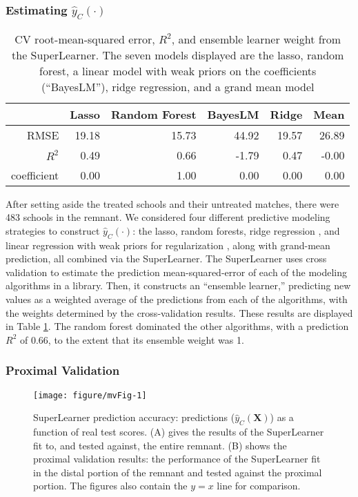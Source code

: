 \documentclass[12pt]{article}\usepackage[]{graphicx}\usepackage[]{color}
\makeatletter
\def\maxwidth{ %
  \ifdim\Gin@nat@width>\linewidth
    \linewidth
  \else
    \Gin@nat@width
  \fi
}
\newenvironment{knitrout}{}{} %
\newcommand{\algorithm}{\hat{y}_C(\cdot)}
\newcommand{\covMat}{\bm{X}}
\makeatother
\begin{document}
\subsubsection{Estimating  $\algorithm$}
\begin{table}[ht]
\centering
\begin{tabular}{rrrrrr}
  \hline
 & Lasso & Random Forest & BayesLM & Ridge & Mean \\ 
  \hline
RMSE & 19.18 & 15.73 & 44.92 & 19.57 & 26.89 \\ 
  $R^2$ & 0.49 & 0.66 & -1.79 & 0.47 & -0.00 \\ 
  coefficient & 0.00 & 1.00 & 0.00 & 0.00 & 0.00 \\ 
   \hline
\end{tabular}
\caption{CV root-mean-squared error,  $R^2$, and ensemble learner weight from the SuperLearner. The seven models displayed are the lasso, random forest, a linear model with weak priors on the coefficients (``BayesLM''), ridge regression, and a grand mean model} 
\label{cvTab}
\end{table}



After setting aside the treated schools and their untreated matches, there were 483 schools in the remnant.
We considered four different predictive modeling strategies to
construct $\algorithm$: the lasso, random forests, ridge regression
\citep{hoerl1970ridge,MASS}, and linear regression with weak priors for
regularization \citep{arm},
 along with
grand-mean prediction, all combined via the
SuperLearner.
The SuperLearner uses cross validation to estimate the prediction mean-squared-error of each of the
modeling algorithms in a library.
Then, it constructs an ``ensemble learner,'' predicting new values as
a weighted average of the predictions from each of the algorithms,
with the weights determined by the cross-validation results.
These results are displayed in Table \ref{cvTab}.
The random forest dominated the other algorithms, with a
prediction $R^2$ of 0.66, to the
extent that its ensemble weight was
1.



\subsubsection{Proximal Validation}


\begin{figure}
\begin{knitrout}
\color{fgcolor}
\texttt{[image: figure/mvFig-1]} 

\end{knitrout}
\caption{SuperLearner prediction accuracy:
predictions ($\hat{y}_C(\covMat)$) as a function of real test scores. (A) gives
the results of the SuperLearner fit to, and tested against, the entire remnant. (B) shows
the proximal validation results: the performance of the SuperLearner fit in the distal portion of the remnant and tested against the proximal portion. The figures also contain the $y=x$
line for comparison.}
\label{fig:cv}
\end{figure}
\end{document}
